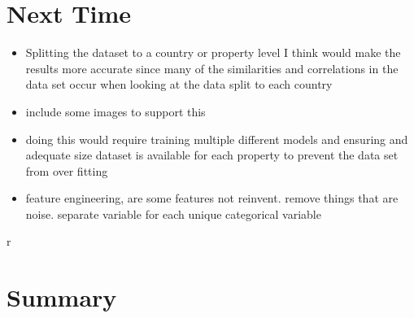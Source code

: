 \section{Next Time}
\begin{itemize}
\item Splitting the dataset to a country or property level I think would make the results more accurate since many of the similarities and correlations in the data set occur when looking at the data split to each country
\item include some images to support this 
\item doing this would require training multiple different models and ensuring and adequate size dataset is available for each property to prevent the data set from over fitting
\item  feature engineering, are some features not reinvent. remove things that are noise. separate variable for each unique categorical variable 
\end{itemize}


r

\section{Summary}